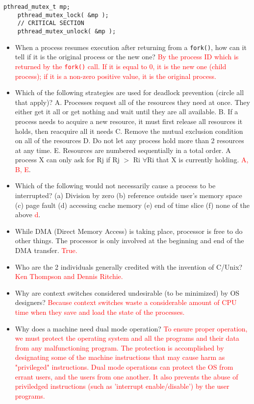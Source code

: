 \documentclass[10pt,landscape]{article}
\newcommand{\answer}[1]{\textcolor{red}{#1}}
\begin{document}
\begin{multicols}{4}
\begin{lstlisting}[style=cC++]
    pthread_mutex_t mp;
    pthread_mutex_lock( &mp );
    // CRITICAL SECTION
    pthread_mutex_unlock( &mp );
\end{lstlisting}

\begin{itemize}
    \item When a process resumes execution after returning from a \verb$fork()$, how can it tell if it is the original process or the new one? \answer{By the process ID which is returned by the \texttt{fork()} call. If it is equal to 0, it is the new one (child process); if it is a non-zero positive value, it is the original process.}
    \item Which of the following strategies are used for deadlock prevention (circle all that apply)?  A. Processes request all of the resources they need at once.  They either get it all or get nothing and wait until they are all available.  B. If a process needs to acquire a new resource, it must first release all resources it holds, then reacquire all it needs C. Remove the mutual exclusion condition on all of the resources D. Do not let any process hold more than 2 resources at any time.  E. Resources are numbered sequentially in a total order. A process X can only ask for Rj if Rj $>$ Ri  $\forall$Ri that X is currently holding.  \answer{A, B, E}.
    \item Which of the following would not necessarily cause a process to be interrupted? (a) Division by zero (b) reference outside user's memory space (c) page fault (d) accessing cache memory (e) end of time slice (f) none of the above \answer{d}.
    \item While DMA (Direct Memory Access) is taking place, processor is free to do other things. The processor is only involved at the beginning and end of the DMA transfer.  \answer{True.}
    \item Who are the 2 individuals generally credited with the invention of C/Unix?  \answer{Ken Thompson and Dennis Ritchie.}
    \item Why are context switches considered undesirable (to be minimized) by OS designers?  \answer{Because context switches waste a considerable amount of CPU time when they save and load the state of the processes.}
    \item Why does a machine need dual mode operation? \answer{To ensure proper operation, we must protect the operating system and all the programs and their data from any malfunctioning program.  The protection is accomplished by designating some of the machine instructions that may cause harm as "privileged" instructions.  Dual mode operations can protect the OS from errant users, and the users from one another.  It also prevents the abuse of priviledged instructions (such as 'interrupt enable/disable') by the user programs.}

\end{itemize}
\end{multicols}
\end{document}
